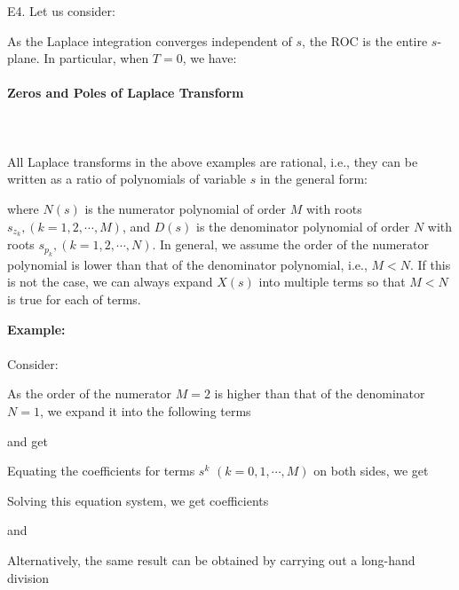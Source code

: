 	\begin{tcolorbox}[colframe=black,colback=white,sharp corners]
	E4. Let us consider:
	
	As the Laplace integration converges independent of $s$, the ROC is the entire $s$-plane. In particular, when $T=0$, we have:
	
	\end{tcolorbox}
	\paragraph{Zeros and Poles of Laplace Transform}\mbox{}\\\\
	All Laplace transforms in the above examples are rational, i.e., they can be written as a ratio of polynomials of variable $s$ in the general form:
	
	where $N(s)$ is the numerator polynomial of order $M$ with roots $s_{z_k}, (k=1,2, \cdots, M)$, and $D(s)$ is the denominator polynomial of order $N$ with roots $s_{p_k}, (k=1,2, \cdots, N)$. In general, we assume the order of the numerator polynomial is lower than that of the denominator polynomial, i.e.,  $M < N$. If this is not the case, we can always expand $X(s)$ into multiple terms so that $M<N$ is true for each of terms.	
	\begin{tcolorbox}[colframe=black,colback=white,sharp corners]
	\textbf{{\Large {}}Example:}\\\\
	Consider:
	
	As the order of the numerator $M=2$ is higher than that of the denominator $N=1$, 
	we expand it into the following terms
	
	and get
	
	Equating the coefficients for terms $s^k$ $(k=0, 1, \cdots, M)$ on both sides, we get
	
	Solving this equation system, we get coefficients
	
	and
	
	Alternatively, the same result can be obtained by carrying out a long-hand division
	
	\end{tcolorbox}
	
